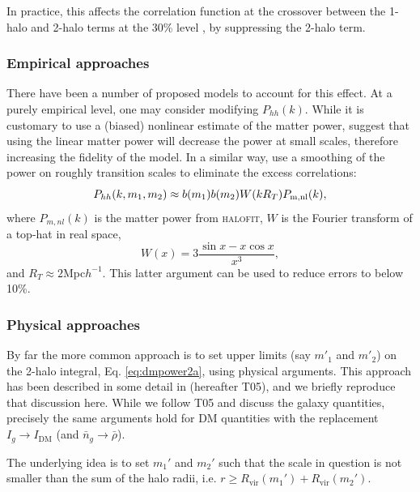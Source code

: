 \documentclass[5p,aas_macros]{elsarticle}
\newcommand{\bd}[1]{\textcolor{purple}{\textbf{[BD: #1]}}}
\newcommand{\sgm}[1]{\textcolor{green}{\textbf{[SM: #1]}}}
\begin{document}
In practice, this affects the correlation function at the crossover between the 1-halo and 2-halo terms at the 30\% level \citep{Schneider2012}, by suppressing the 2-halo term. 

\subsubsection{Empirical approaches}
There have been a number of proposed models to account for this effect. At a purely empirical level, one may consider modifying $P_{hh}(k)$. While it is customary to use a (biased) nonlinear estimate of the matter power, \citet{Cooray2002} suggest that using the linear matter power  will decrease the power at small scales, therefore increasing the fidelity of the model. In a similar way, \citet{Schneider2013} use a smoothing of the power on roughly transition scales to eliminate the excess correlations:
\begin{equation}
    P_{hh}(k,m_1,m_2) \approx b(m_1)b(m_2) W(kR_T) P_{\rm m, nl}(k),
\end{equation}
where $P_{m, nl}(k)$ is the matter power from \textsc{halofit}, $W$ is the Fourier transform of a top-hat in real space,
\begin{equation}
    W(x) = 3\frac{\sin x - x\cos x}{x^3},
\end{equation}
and $R_T\approx2 $Mpc$h^{-1}$.
This latter argument can be used to reduce errors to below 10\%.

\subsubsection{Physical approaches}
By far the more common approach is to set upper limits (say $m'_1$ and $m'_2$) on the 2-halo integral, Eq. \ref{eq:dmpower2a}, using physical arguments. This approach has been described in some detail in \citet{Tinker2005} (hereafter T05), 
and we briefly reproduce that discussion here. While we follow T05 and discuss the galaxy quantities, precisely the same arguments hold for DM quantities with the replacement $I_g \rightarrow I_\text{DM}$ (and $\bar{n}_g \rightarrow \bar{\rho}$). 

The  underlying idea  is to set $m_1'$ and $m_2'$ such that the scale in question is not smaller than the sum of the halo radii, i.e. $r \ge R_\text{vir}(m_1') + R_\text{vir}(m_2')$. 
\end{document}
